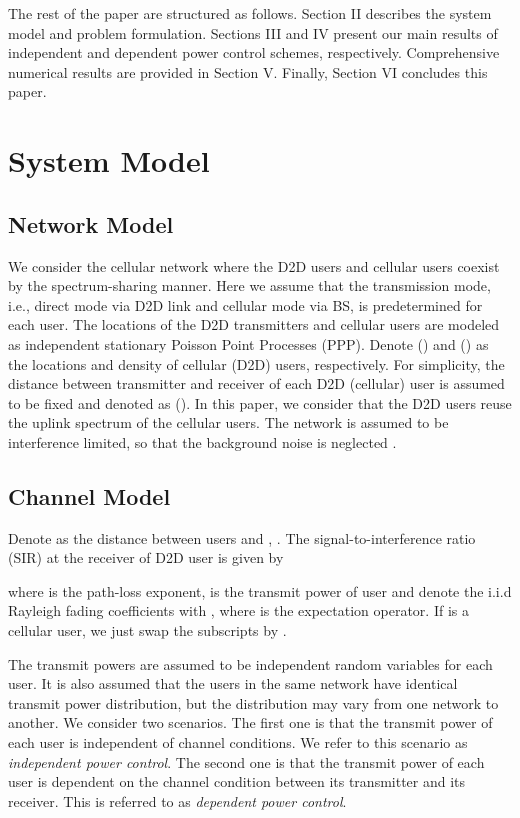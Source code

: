 \documentclass[12pt, draftclsnofoot, journal, letterpaper, onecolumn]{IEEEtran}
\begin{document}
The rest of the paper are structured as follows. Section II describes the system model and problem formulation. Sections III and IV present our main results of independent and dependent power control schemes, respectively. Comprehensive numerical results are provided in Section V. Finally, Section VI concludes this paper.

\section{System Model}
\subsection{Network Model}

We consider the cellular network where the D2D users and cellular users coexist by the spectrum-sharing manner. Here we assume that the transmission mode, i.e., direct mode via D2D link and cellular mode via BS, is predetermined for each user. The locations of the D2D transmitters and cellular users are modeled as independent stationary Poisson Point Processes (PPP). Denote  () and  () as the locations and density of cellular (D2D) users, respectively. For simplicity, the distance between transmitter and receiver of each D2D (cellular) user is assumed to be fixed and denoted as  ().
In this paper, we consider that the D2D users reuse the uplink spectrum of the cellular users. The network is assumed to be interference limited, so that the background noise is neglected \cite{overlaid,SGLD}.

\subsection{Channel Model}

Denote   as the distance between users  and , .
The signal-to-interference ratio (SIR) at the receiver of D2D user  is given by

where  is the path-loss exponent,  is the transmit power of user  and  denote the i.i.d Rayleigh fading coefficients with , where  is the expectation operator.
If  is a cellular user, we just swap the subscripts  by .

The transmit powers are assumed to be independent random variables for each user. It is also assumed that the users in the same network have identical transmit power distribution, but the distribution may vary from one network to another.
We consider two scenarios. The first one is that the transmit power of each user is independent of channel conditions. We refer to this scenario as \emph{independent power control}. The second one is that the transmit power of each user is dependent on the channel condition between its transmitter and its receiver. This is referred to as \emph{dependent power control}.
\end{document}
